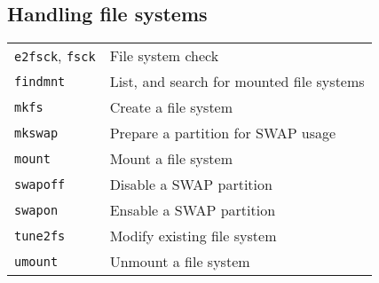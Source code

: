 \documentclass[10pt]{article}
\begin{document}
\begin{multicols}{2} 
\section{Handling file systems}
\begin{tabular}{ p{2.5cm} p{8.5cm} }
  \hline
  \texttt{e2fsck}, \texttt{fsck} & File system check \\
  \rowcolor{Gray}
  \texttt{findmnt} & List, and search for mounted file systems \\
  \texttt{mkfs} & Create a file system \\
  \rowcolor{Gray}
  \texttt{mkswap} & Prepare a partition for SWAP usage \\
  \texttt{mount} & Mount a file system \\
  \rowcolor{Gray}
  \texttt{swapoff} & Disable a SWAP partition \\
  \texttt{swapon} & Ensable a SWAP partition \\
  \rowcolor{Gray}
  \texttt{tune2fs} & Modify existing file system \\
  \texttt{umount} & Unmount a file system\\
  \hline
\end{tabular}



\end{multicols}
\end{document}
